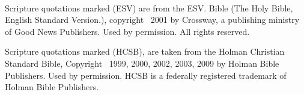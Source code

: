 \frontmatter

\maketitle
\clearpage
~\vfill
\begin{center}
Scripture quotations marked (ESV) are from the ESV\textsuperscript{\textregistered}. Bible (The Holy Bible, English Standard Version\textsuperscript{\textregistered}.), copyright \textcopyright~2001 by Crossway, a publishing ministry of Good News Publishers. Used by permission. All rights reserved.

\vspace{2em}

Scripture quotations marked (HCSB), are taken from the Holman Christian Standard Bible\textsuperscript{\textregistered}, Copyright \textcopyright~1999, 2000, 2002, 2003, 2009 by Holman Bible Publishers. Used by permission. HCSB\textsuperscript{\textregistered} is a federally registered trademark of Holman Bible Publishers.
\end{center}
\clearpage

\tableofcontents





\mainmatter



























\appendix
\backmatter

